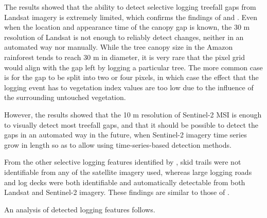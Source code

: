 \documentclass[a4paper,12pt]{scrbook}
\begin{document}
The results showed that the ability to detect selective logging treefall gaps from Landsat imagery is extremely limited, which confirms the findings of \citet{asner_remote_2002} and \citet{asner_canopy_2004}. Even when the location and appearance time of the canopy gap is known, the 30 m resolution of Landsat is not enough to reliably detect changes, neither in an automated way nor manually. While the tree canopy size in the Amazon rainforest tends to reach 30 m in diameter, it is very rare that the pixel grid would align with the gap left by logging a particular tree. The more common case is for the gap to be split into two or four pixels, in which case the effect that the logging event has to vegetation index values are too low due to the influence of the surrounding untouched vegetation.

However, the results showed that the 10 m resolution of Sentinel-2 \ac{MSI} is enough to visually detect most treefall gaps, and that it should be possible to detect the gaps in an automated way in the future, when Sentinel-2 imagery time series grow in length so as to allow using time-series-based detection methods.

From the other selective logging features identified by \citet{asner_remote_2002}, skid trails were not identifiable from any of the satellite imagery used, whereas large logging roads and log decks were both identifiable and automatically detectable from both Landsat and Sentinel-2 imagery. These findings are similar to those of \citet{read_spatial_2003}.

An analysis of detected logging features follows.
\end{document}
